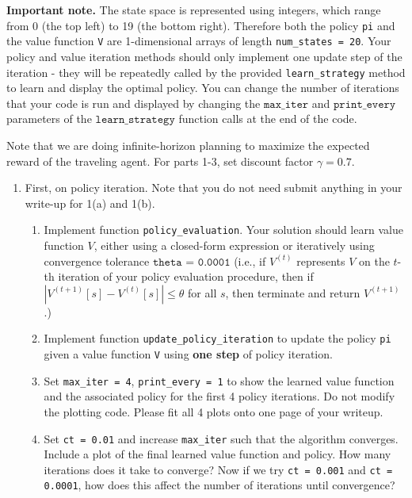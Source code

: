 \documentclass[submit]{../harvardml}
\begin{document}
\begin{problem}
\noindent \textbf{Important note.} The state space is represented using integers, which range from 0 (the top left) to 19 (the bottom right). Therefore both the policy \texttt{pi} and the value function \texttt{V} are 1-dimensional arrays of length \texttt{num\_states = 20}. Your policy and value iteration methods should only implement one update step of the iteration - they will be repeatedly called by the provided \texttt{learn\_strategy} method to learn and display the optimal policy. You can change the number of iterations that your code is run and displayed by changing the $\texttt{max\_iter}$ and $\texttt{print\_every}$ parameters of the $\texttt{learn\_strategy}$ function calls at the end of the code.

Note that we are doing infinite-horizon planning to maximize the expected reward of the traveling agent. For parts 1-3, set discount factor $\gamma = 0.7$.

\begin{enumerate}
    \item First, on policy iteration. Note that you do not need submit anything in your write-up for 1(a) and 1(b).
    \begin{enumerate}
        \item Implement function \texttt{policy\_evaluation}.  Your solution should learn value function $V$, either using a closed-form expression or iteratively using convergence tolerance $\texttt{theta = 0.0001}$ (i.e., if $V^{(t)}$ represents $V$ on the $t$-th iteration of your policy evaluation procedure, then if $|V^{(t + 1)}[s] - V^{(t)}[s]| \leq \theta$ for all $s$, then terminate and return $V^{(t + 1)}$.)
    
        \item Implement function \texttt{update\_policy\_iteration} to update the policy \texttt{pi} given a value function \texttt{V} using \textbf{one step} of policy iteration.
        
        \item Set \texttt{max\_iter = 4}, \texttt{print\_every = 1} to show the learned value function and the associated policy for the first 4 policy iterations. Do not modify the plotting code. Please fit all 4 plots onto one page of your writeup.
        
        \item Set \texttt{ct = 0.01} and increase \texttt{max\_iter} such that the algorithm converges. Include a plot of the final learned value function and policy. How many iterations does it take to converge? Now if we try \texttt{ct = 0.001} and \texttt{ct = 0.0001}, how does this affect the number of iterations until convergence?
    \end{enumerate}
      

\end{enumerate}
\end{problem}
\end{document}
